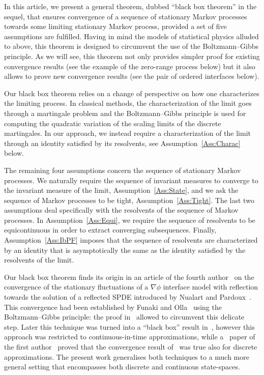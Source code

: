 \documentclass[10pt]{amsart}
\theoremstyle{definition}\newtheorem{defi}[theo]{Definition}\newtheorem{rema}[theo]{Remark}\newtheorem{exam}[theo]{Example}\newtheorem{exem}[theo]{Example}\newtheorem{nota}[theo]{Notation}
\theoremstyle{plain}
\newcounter{setofstep}
\newcounter{step}[setofstep]
\begin{document}
In this article, we present a general theorem, dubbed ``black box theorem'' in the sequel, that ensures convergence of a sequence of stationary Markov processes towards some limiting stationary Markov process, provided a set of five assumptions are fulfilled. Having in mind the models of statistical physics alluded to above, this theorem is designed to circumvent the use of the Boltzmann--Gibbs principle. As we will see, this theorem not only provides simpler proof for existing convergence results (see the example of the zero-range process below) but it also allows to prove new convergence results (see the pair of ordered interfaces below).

Our black box theorem relies on a change of perspective on how one characterizes the limiting process. In classical methods, the characterization of the limit goes through a martingale problem and the Boltzmann--Gibbs principle is used for computing the quadratic variation of the scaling limits of the discrete martingales. In our approach, we instead require a characterization of the limit through an identity satisfied by its resolvents, see Assumption~\ref{Ass:Charac} below.

The remaining four assumptions concern the sequence of stationary Markov processes. We naturally require the sequence of invariant measures to converge to the invariant measure of the limit, Assumption~\ref{Ass:State}, and we ask the sequence of Markov processes to be tight, Assumption~\ref{Ass:Tight}. The last two assumptions deal specifically with the resolvents of the sequence of Markov processes. In Assumption~\ref{Ass:Equi}, we require the sequence of resolvents to be equicontinuous in order to extract converging subsequences. Finally, Assumption~\ref{Ass:IbPF} imposes that the sequence of resolvents are characterized by an identity that is asymptotically the same as the identity satisfied by the resolvents of the limit.

Our black box theorem finds its origin in an article of the fourth author~\cite{Zam04} on the convergence of the stationary fluctuations of a $\nabla\phi$ interface model with reflection towards the solution of a reflected SPDE introduced by Nualart and Pardoux~\cite{NualartPardoux92}. This convergence had been established by Funaki and Olla~\cite{FunaOlla} using the Boltzmann--Gibbs principle: the proof in~\cite{Zam04} allowed to circumvent this delicate step. Later this technique was turned into a ``black box'' result in~\cite{MR2267701}, however this approach was restricted to continuous-in-time approximations, while a ~paper of the first author~\cite{EthLab} proved that the convergence result of~\cite{Zam04} was true also for discrete approximations. The present work generalises both techniques to a much more general setting that encompasses both discrete and continuous state-spaces.
\end{document}
